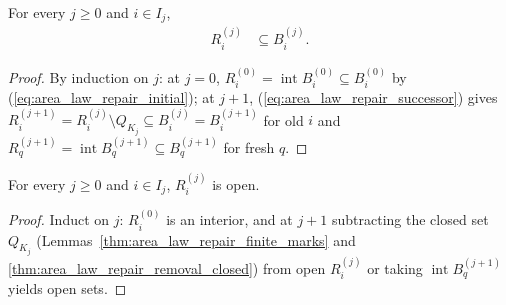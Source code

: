 \begin{lemma}
    \label{thm:area_law_repair_current_birth_containment}
    \leanok
    For every $j\ge0$ and $i\in I_j$,
    \begin{align}
        R_i^{(j)} & \subseteq B_i^{(j)}.
        \label{eq:area_law_repair_current_birth_containment}
    \end{align}
\end{lemma}
\begin{proof}\leanok
    By induction on $j$: at $j=0$, $R_i^{(0)}=\operatorname{int}B_i^{(0)}\subseteq B_i^{(0)}$
    by (\ref{eq:area_law_repair_initial}); at $j+1$, (\ref{eq:area_law_repair_successor}) gives
    $R_i^{(j+1)}=R_i^{(j)}\setminus Q_{K_j}\subseteq B_i^{(j)}=B_i^{(j+1)}$ for old $i$ and
    $R_q^{(j+1)}=\operatorname{int}B_q^{(j+1)}\subseteq B_q^{(j+1)}$ for fresh $q$.
\end{proof}

\begin{lemma}
    \label{thm:area_law_repair_current_open}
    \leanok
    For every $j\ge0$ and $i\in I_j$, $R_i^{(j)}$ is open.
\end{lemma}

\begin{proof}\leanok
    Induct on $j$: $R_i^{(0)}$ is an interior, and at $j+1$ subtracting the closed set $Q_{K_j}$
    (Lemmas~\ref{thm:area_law_repair_finite_marks} and \ref{thm:area_law_repair_removal_closed})
    from open $R_i^{(j)}$ or taking $\operatorname{int}B_q^{(j+1)}$ yields open sets.
\end{proof}

